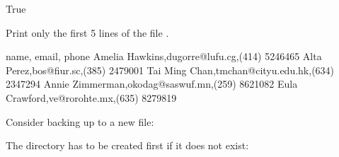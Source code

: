 \documentclass[letterpaper,10pt,english]{sphinxmanual}
\begin{document}
\begin{sphinxVerbatim}[commandchars=\\\{\}]
True
\end{sphinxVerbatim}

 Print only the first 5 lines of the file .

\begin{sphinxVerbatim}[commandchars=\\\{\}]
   
        
         
            
\end{sphinxVerbatim}

\begin{sphinxVerbatim}[commandchars=\\\{\}]
name, email, phone
Amelia Hawkins,dugorre@lufu.cg,(414) 524\PYGZhy{}6465
Alta Perez,bos@fiur.sc,(385) 247\PYGZhy{}9001
Tai Ming Chan,tmchan@cityu.edu.hk,(634) 234\PYGZhy{}7294
Annie Zimmerman,okodag@saswuf.mn,(259) 862\PYGZhy{}1082
Eula Crawford,ve@rorohte.mx,(635) 827\PYGZhy{}9819
\end{sphinxVerbatim}


Consider backing up  to a new file:

\begin{sphinxVerbatim}[commandchars=\\\{\}]
  
\end{sphinxVerbatim}

The directory has to be created first if it does not exist:

\begin{sphinxVerbatim}[commandchars=\\\{\}]
 
 
\end{sphinxVerbatim}
\end{document}
